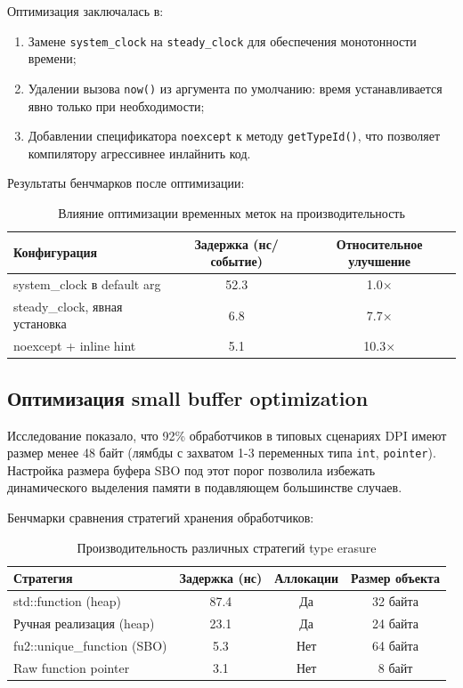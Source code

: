 \documentclass[12pt,a4paper]{report}
\begin{document}
Оптимизация заключалась в:
\begin{enumerate}
    \item Замене \texttt{system\_clock} на \texttt{steady\_clock} для обеспечения монотонности времени;
    \item Удалении вызова \texttt{now()} из аргумента по умолчанию: время устанавливается явно только при необходимости;
    \item Добавлении спецификатора \texttt{noexcept} к методу \texttt{getTypeId()}, что позволяет компилятору агрессивнее инлайнить код.
\end{enumerate}

Результаты бенчмарков после оптимизации:
\begin{table}[H]
\centering
\caption{Влияние оптимизации временных меток на производительность}
\label{tab:timestamp_opt}
\begin{tabular}{lcc}
\toprule
\textbf{Конфигурация} & \textbf{Задержка (нс/событие)} & \textbf{Относительное улучшение} \\
\midrule
system\_clock в default arg & 52.3 & 1.0× \\
steady\_clock, явная установка & 6.8 & 7.7× \\
noexcept + inline hint & 5.1 & 10.3× \\
\bottomrule
\end{tabular}
\end{table}

\subsection{Оптимизация small buffer optimization}
Исследование показало, что 92\% обработчиков в типовых сценариях DPI имеют размер менее 48 байт (лямбды с захватом 1-3 переменных типа \texttt{int}, \texttt{pointer}). Настройка размера буфера SBO под этот порог позволила избежать динамического выделения памяти в подавляющем большинстве случаев.

Бенчмарки сравнения стратегий хранения обработчиков:
\begin{table}[H]
\centering
\caption{Производительность различных стратегий type erasure}
\label{tab:type_erasure_perf}
\begin{tabular}{lccc}
\toprule
\textbf{Стратегия} & \textbf{Задержка (нс)} & \textbf{Аллокации} & \textbf{Размер объекта} \\
\midrule
std::function (heap) & 87.4 & Да & 32 байта \\
Ручная реализация (heap) & 23.1 & Да & 24 байта \\
fu2::unique\_function (SBO) & 5.3 & Нет & 64 байта \\
Raw function pointer & 3.1 & Нет & 8 байт \\
\bottomrule
\end{tabular}
\end{table}
\end{document}
